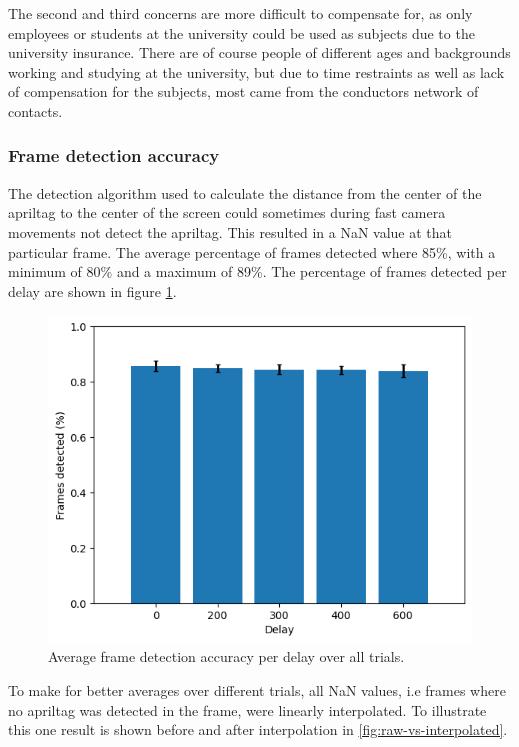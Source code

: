\documentclass[nofilelist]{cslthse-msc}
\begin{document}
The second and third concerns are more difficult to compensate for, as only employees or students at the university could be used as subjects due to the university insurance. There are of course people of different ages and backgrounds working and studying at the university, but due to time restraints as well as lack of compensation for the subjects, most came from the conductors network of contacts.

\subsubsection{Frame detection accuracy}
The detection algorithm used to calculate the distance from the center of the apriltag to the center of the screen could sometimes during fast camera movements not detect the apriltag. This resulted in a NaN value at that particular frame. The average percentage of frames detected where 85\%, with a minimum of 80\% and a maximum of 89\%. The percentage of frames detected per delay are shown in figure \ref{fig:frames-detected}. 

\begin{figure}[!hbt]
   \centering
   \includegraphics[scale=0.7]{images/frames-detected.png} 
   \caption{Average frame detection accuracy per delay over all trials.}
   \label{fig:frames-detected}
\end{figure}

To make for better averages over different trials, all NaN values, i.e frames where no apriltag was detected in the frame, were linearly interpolated. To illustrate this one result is shown before and after interpolation in \ref{fig:raw-vs-interpolated}. 
\end{document}
